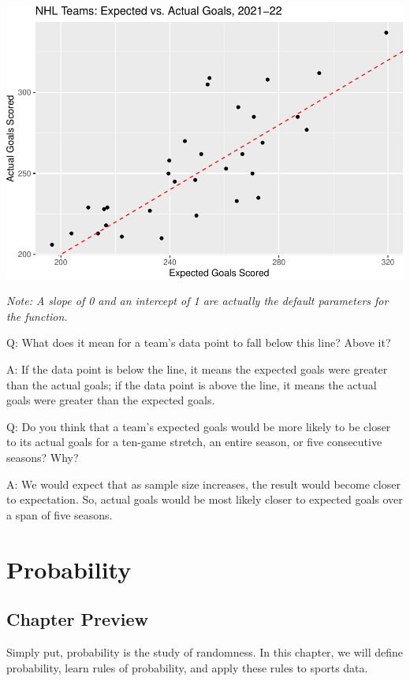 \documentclass[
]{book}
\theoremstyle{definition}
\theoremstyle{definition}
\theoremstyle{definition}
\theoremstyle{definition}
\theoremstyle{remark}
\begin{document}
\includegraphics{series_files/figure-latex/hockey_ggplot4-1.pdf}

\emph{Note: A slope of 0 and an intercept of 1 are actually the default parameters for the function.}

Q: What does it mean for a team's data point to fall below this line? Above it?

A: If the data point is below the line, it means the expected goals were greater than the actual goals; if the data point is above the line, it means the actual goals were greater than the expected goals.

Q: Do you think that a team's expected goals would be more likely to be closer to its actual goals for a ten-game stretch, an entire season, or five consecutive seasons? Why?

A: We would expect that as sample size increases, the result would become closer to expectation. So, actual goals would be most likely closer to expected goals over a span of five seasons.

\hypertarget{probability}{%
\chapter{Probability}\label{probability}}

\hypertarget{chapter-preview}{%
\section*{Chapter Preview}\label{chapter-preview}}

Simply put, probability is the study of randomness. In this chapter, we will define probability, learn rules of probability, and apply these rules to sports data.
\end{document}

